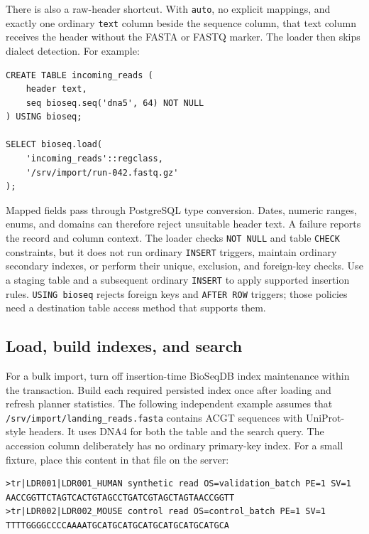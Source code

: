 There is also a raw-header shortcut. With \texttt{auto}, no explicit mappings,
and exactly one ordinary \texttt{text} column beside the sequence column,
that text column receives the header without the FASTA or FASTQ marker.
The loader then skips dialect detection. For example:
\par\noindent\begin{minipage}{\linewidth}
\begin{lstlisting}[style=bioseq-appendix-sql]
CREATE TABLE incoming_reads (
    header text,
    seq bioseq.seq('dna5', 64) NOT NULL
) USING bioseq;

SELECT bioseq.load(
    'incoming_reads'::regclass,
    '/srv/import/run-042.fastq.gz'
);
\end{lstlisting}
\end{minipage}

Mapped fields pass through PostgreSQL type conversion. Dates, numeric ranges,
enums, and domains can therefore reject unsuitable header text. A failure
reports the record and column context. The loader checks \texttt{NOT NULL}
and table \texttt{CHECK} constraints, but it does not run ordinary
\texttt{INSERT} triggers, maintain ordinary secondary indexes, or perform
their unique, exclusion, and foreign-key checks. Use a staging table and a
subsequent ordinary \texttt{INSERT} to apply supported insertion rules.
\texttt{USING bioseq} rejects foreign keys and \texttt{AFTER ROW} triggers;
those policies need a destination table access method that supports them.

\subsection{Load, build indexes, and search}

For a bulk import, turn off insertion-time BioSeqDB index maintenance within
the transaction. Build each required persisted index once after loading and
refresh planner statistics. The following independent example assumes that
\texttt{/srv/import/landing\_reads.fasta} contains ACGT sequences with
UniProt-style headers. It uses DNA4 for both the table and the search query.
The accession column deliberately has no ordinary primary-key index.
For a small fixture, place this content in that file on the server:
\par\noindent\begin{minipage}{\linewidth}
\begin{lstlisting}[style=bioseq-appendix-text]
>tr|LDR001|LDR001_HUMAN synthetic read OS=validation_batch PE=1 SV=1
AACCGGTTCTAGTCACTGTAGCCTGATCGTAGCTAGTAACCGGTT
>tr|LDR002|LDR002_MOUSE control read OS=control_batch PE=1 SV=1
TTTTGGGGCCCCAAAATGCATGCATGCATGCATGCATGCATGCA
\end{lstlisting}
\end{minipage}

